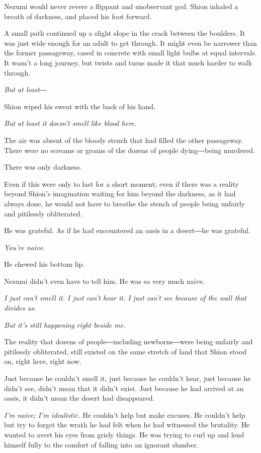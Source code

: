 Nezumi would never revere a flippant and unobservant god. Shion inhaled
a breath of darkness, and placed his foot forward.

A small path continued up a slight slope in the crack between the
boulders. It was just wide enough for an adult to get through. It might
even be narrower than the former passageway, cased in concrete with
small light bulbs at equal intervals. It wasn't a long journey, but
twists and turns made it that much harder to walk through.

\emph{But at least―}

Shion wiped his sweat with the back of his hand.

\emph{But at least it doesn't smell like blood here.}

The air was absent of the bloody stench that had filled the other
passageway. There were no screams or groans of the dozens of people
dying―being murdered.

There was only darkness.

Even if this were only to last for a short moment; even if there was a
reality beyond Shion's imagination waiting for him beyond the darkness,
as it had always done, he would not have to breathe the stench of people
being unfairly and pitilessly obliterated.

He was grateful. As if he had encountered an oasis in a desert―he was
grateful.

\emph{You're naive.}

He chewed his bottom lip.

Nezumi didn't even have to tell him. He was so very much naive.

\emph{I just can't smell it. I just can't hear it. I just can't see because of
	the wall that divides us.}

\emph{But it's still happening right beside me.}

The reality that dozens of people―including newborns―were being unfairly
and pitilessly obliterated, still existed on the same stretch of land
that Shion stood on, right here, right now.

Just because he couldn't smell it, just because he couldn't hear, just
because he didn't see, didn't mean that it didn't exist. Just because he
had arrived at an oasis, it didn't mean the desert had disappeared.

\emph{I'm naive; I'm idealistic.} He couldn't help but make excuses. He
couldn't help but try to forget the wrath he had felt when he had
witnessed the brutality. He wanted to avert his eyes from grisly things.
He was trying to curl up and lend himself fully to the comfort of
falling into an ignorant slumber.

